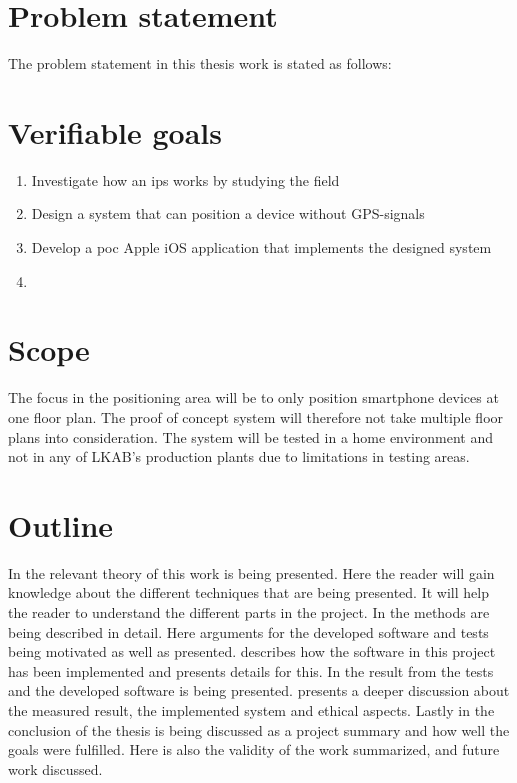 \section{Problem statement}\label{sec:introProblemStatement}
The problem statement in this thesis work is stated as follows:

\section{Verifiable goals}\label{sec:introGoals}
\begin{enumerate}
	\item \label{goal:fieldInvestigation}
	Investigate how an \acrfull{ips} works by studying the field

	\item \label{goal:systemDesign}
	Design a system that can position a device without GPS-signals

	\item \label{goal:poc}
	Develop a \acrfull{poc} Apple iOS application that implements the designed system

	\item \label{goal:systemEvaluation}
\end{enumerate}


\section{Scope}
The focus in the positioning area will be to only position smartphone devices at one floor plan.
The proof of concept system will therefore not take multiple floor plans into consideration.
The system will be tested in a home environment and not in any of LKAB's production plants due to
limitations in testing areas.


\section{Outline}
In  the relevant theory of this work is being presented.
Here the reader will gain knowledge about the different techniques that are being presented.
It will help the reader to understand the  different parts in the project.
In  the methods are being described in detail.
Here arguments for the developed software and tests being motivated as well as presented.
 describes how the software in this project has been implemented and presents details for this.
In  the result from the tests and the developed software is being presented.
 presents a deeper discussion about the measured result, the implemented system and ethical aspects.
Lastly in  the conclusion of the thesis is being discussed as a project summary and how well the goals were fulfilled.
Here is also the validity of the work summarized, and future work discussed.

